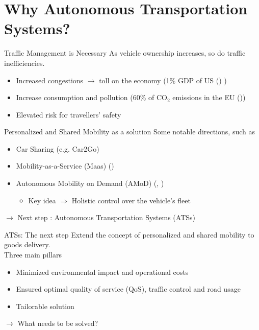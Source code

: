 \section{Why Autonomous Transportation Systems?}
\begin{frame}{Traffic Management is Necessary }
	As vehicle ownership increases, so do traffic inefficiencies. 
	\vspace{0.5cm}
	\begin{itemize}
		\item Increased congestions $\rightarrow$ toll on the economy (1\% GDP of US (\cite{schrank2012}) )
		\item Increase consumption and pollution (60\% of $\text{CO}_2$ emissions in the EU (\cite{eea2023}))
		\item Elevated risk for travellers' safety
	\end{itemize}
\end{frame}


\begin{frame}{Personalized and Shared Mobility as a solution }
	Some notable directions, such as 
	
	\begin{itemize}
		\item  Car Sharing (e.g. Car2Go)
		\item Mobility-as-a-Service (Maas) (\cite{tomaino2020maas})
		\item Autonomous Mobility on Demand (AMoD) (\cite{amod_review}, \cite{zhang2016})
		\begin{itemize}
			\item[ ] Key idea $\Rightarrow$ Holistic control over the vehicle's fleet
		\end{itemize}
	\end{itemize}
	$\rightarrow$ Next step : Autonomous Transportation Systems (ATSs) 
	
\end{frame}


\begin{frame}{ATSs: The next step }
	Extend the concept of personalized and shared mobility to goods delivery.\\
	Three main pillars 
	\vspace{0.3cm}
	\begin{itemize}
		\item Minimized environmental impact and operational costs
		\item Ensured optimal quality of service (QoS), traffic control and road usage
		\item Tailorable solution
	\end{itemize}
	$\rightarrow$ What needs to be solved?
\end{frame}
